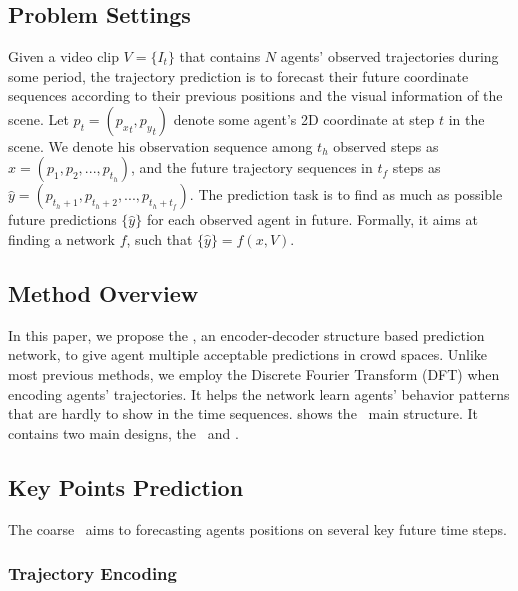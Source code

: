 \documentclass[../paper.tex]{subfiles}
\begin{document}
    
\section{\MODEL}

\subsection{Problem Settings}

Given a video clip $V = \{I_t\}$ that contains $N$ agents' observed trajectories during some period, the trajectory prediction is to forecast their future coordinate sequences according to their previous positions and the visual information of the scene.
Let $p_t = ({p_x}_t, {p_y}_t)$ denote some agent's 2D coordinate at step $t$ in the scene.
We denote his observation sequence among $t_h$ observed steps as $x = (p_1, p_2, ..., p_{t_h})$, and the future trajectory sequences in $t_f$ steps as $\hat{y} = (p_{t_h + 1}, p_{t_h + 2}, ..., p_{t_h + t_f})$.
The prediction task is to find as much as possible future predictions $\{\hat{y}\}$ for each observed agent in future.
Formally, it aims at finding a network $f$, such that $\{\hat{y}\} = f(x, V)$.

\subsection{Method Overview}


In this paper, we propose the \MODEL, an encoder-decoder structure based prediction network, to give agent multiple acceptable predictions in crowd spaces.
Unlike most previous methods, we employ the Discrete Fourier Transform (DFT) when encoding agents' trajectories.
It helps the network learn agents' behavior patterns that are hardly to show in the time sequences.
 shows the \MODEL~main structure.
It contains two main designs, the \ALPHAMODEL~and \BETAMODEL.

\subsection{Key Points Prediction}

The coarse \ALPHAMODEL~aims to forecasting agents positions on several key future time steps.

\subsubsection{Trajectory Encoding}
\end{document}
